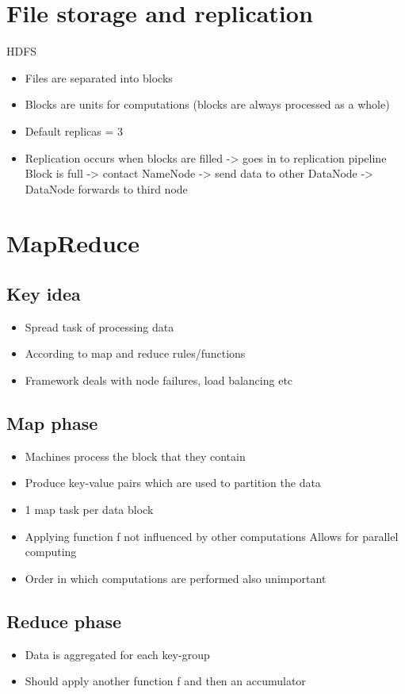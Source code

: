 \documentclass[10pt,a4paper]{scrreprt}
\begin{document}
\section{File storage and replication}
HDFS
\begin{itemize}
	\item Files are separated into blocks
	\item Blocks are units for computations (blocks are always processed as a whole)
	\item Default replicas = 3
	\item Replication occurs when blocks are filled -> goes in to replication pipeline
	\subitem Block is full -> contact NameNode -> send data to other DataNode -> DataNode forwards to third node
\end{itemize}

\section{MapReduce}
\subsection{Key idea}
\begin{itemize}
	\item Spread task of processing data
	\item According to map and reduce rules/functions
	\item Framework deals with node failures, load balancing etc
\end{itemize}

\subsection{Map phase}
\begin{itemize}
	\item Machines process the block that they contain
	\item Produce key-value pairs which are used to partition the data
	\item 1 map task per data block
	\item Applying function f not influenced by other computations
	\subitem Allows for parallel computing
	\item Order in which computations are performed also unimportant
\end{itemize}

\subsection{Reduce phase}
\begin{itemize}
	\item Data is aggregated for each key-group
	\item Should apply another function f and then an accumulator
\end{itemize}
\end{document}
